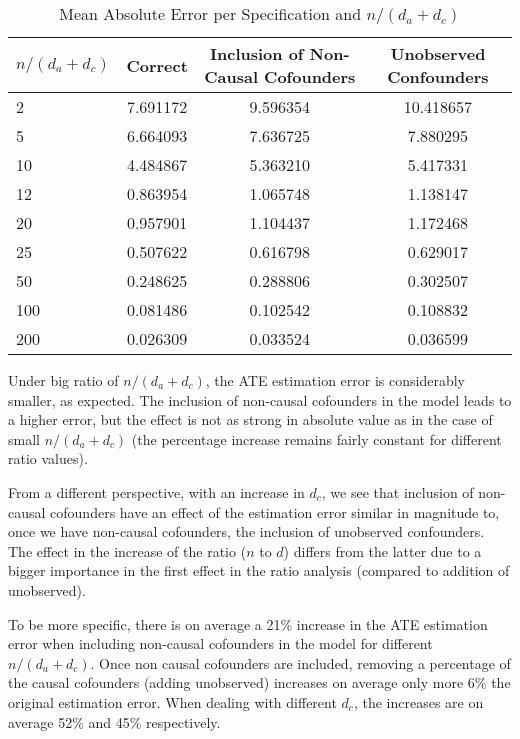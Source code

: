 \documentclass{article}
\numberwithin{equation}{section}
\begin{document}
\begin{table}[H]
    \centering
    \begin{tabular}{lccc}
        \toprule
        $n / (d_a + d_c)$ & Correct & Inclusion of Non-Causal Cofounders & Unobserved Confounders \\
        \midrule
        2 & 7.691172 & 9.596354 & 10.418657 \\
        5 & 6.664093 & 7.636725 & 7.880295 \\
        10 & 4.484867 & 5.363210 & 5.417331 \\
        12 & 0.863954 & 1.065748 & 1.138147 \\
        20 & 0.957901 & 1.104437 & 1.172468 \\
        25 & 0.507622 & 0.616798 & 0.629017 \\
        50 & 0.248625 & 0.288806 & 0.302507 \\
        100 & 0.081486 & 0.102542 & 0.108832 \\
        200 & 0.026309 & 0.033524 & 0.036599 \\
        \bottomrule
    \end{tabular}
    \caption{Mean Absolute Error per Specification and $n / (d_a + d_c)$}
\end{table}

Under big ratio of $n / (d_a + d_c)$, the ATE estimation error is considerably smaller, as expected. The inclusion of non-causal cofounders in the model leads to a higher error, but the effect is not as strong in absolute value as in the case of small $n / (d_a + d_c)$ (the percentage increase remains fairly constant for different ratio values).

From a different perspective, with an increase in $d_c$, we see that inclusion of non-causal cofounders have an effect of the estimation error similar in magnitude to, once we have non-causal cofounders, the inclusion of unobserved confounders. The effect in the increase of the ratio ($n$ to $d$) differs from the latter due to a bigger importance in the first effect in the ratio analysis (compared to addition of unobserved).

To be more specific, there is on average a 21\% increase in the ATE estimation error when including non-causal cofounders in the model for different $n / (d_a + d_c)$. Once non causal cofounders are included, removing a percentage of the causal cofounders (adding unobserved) increases on average only more 6\% the original estimation error. When dealing with different $d_c$, the increases are on average 52\% and 45\% respectively. 
\end{document}
